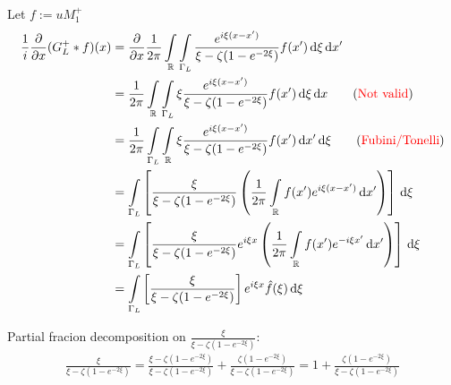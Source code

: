\documentclass[../dissertation.tex]{subfiles}
\begin{document}
Let $f:=uM_1^+$
\begin{align*}
	\frac{1}{i} \frac{\partial}{\partial x} (G_L^+ * f)(x)
		&= \frac{\partial}{\partial x} \frac{1}{2\pi}
			\mathop{\int}_{\mathbb R} 
				\mathop{\int}_{{\Gamma_L}} 
					\frac{e^{i \xi(x-x')}}{\xi-\zeta(1-e^{-2\xi})} f(x')
				\, \mathrm{d}\xi
			\, \mathrm{d}x' \\
		&= \frac{1}{2\pi}
			\mathop{\int}_{\mathbb R} 
				\mathop{\int}_{{\Gamma_L}} 
					\xi \frac{e^{i \xi(x-x')}}{\xi-\zeta(1-e^{-2\xi})} f(x')
				\, \mathrm{d}\xi
			\, \mathrm{d}x \qquad (\text{\color{red}Not valid})\\
		&= \frac{1}{2\pi}
			\mathop{\int}_{{\Gamma_L}} 
				\mathop{\int}_{\mathbb R} 
					\xi \frac{e^{i \xi(x-x')}}{\xi-\zeta(1-e^{-2\xi})} f(x')
				\, \mathrm{d}x'
			\, \mathrm{d}\xi \qquad (\text{\color{red}Fubini/Tonelli})\\
		&= \mathop{\int}_{{\Gamma_L}} 
				\left[
					\frac{\xi}{\xi-\zeta(1-e^{-2\xi})}
					\left(
						\frac{1}{2\pi}
						\mathop{\int}_{\mathbb R} 
							f(x')e^{i\xi(x-x')}
						\, \mathrm{d}x'
					\right)
				\right]
			\, \mathrm{d}\xi \\
		&= \mathop{\int}_{{\Gamma_L}} 
				\left[
					\frac{\xi}{\xi-\zeta(1-e^{-2\xi})}
					e^{i\xi x}
					\left(
						\frac{1}{2\pi}
						\mathop{\int}_{\mathbb R} 
							f(x')e^{-i\xi x'}
						\, \mathrm{d}x'
					\right)
				\right]
			\, \mathrm{d}\xi \\
		&= \mathop{\int}_{{\Gamma_L}} 
				\left[
					\frac{\xi}{\xi-\zeta(1-e^{-2\xi})}
				\right]
				e^{i\xi x} \hat f(\xi)
			\, \mathrm{d}\xi \\
\end{align*}

Partial fracion decomposition on $\displaystyle \frac{\xi}{\xi-\zeta(1-e^{-2\xi})}$:
\begin{align*}
	\frac{\xi}{\xi-\zeta(1-e^{-2\xi})}
		= \frac{\xi - \zeta(1-e^{-2\xi})}{\xi-\zeta(1-e^{-2\xi})} 
			+ \frac{\zeta(1-e^{-2\xi})}{\xi-\zeta(1-e^{-2\xi})} 
		= 1 + \frac{\zeta(1-e^{-2\xi})}{\xi-\zeta(1-e^{-2\xi})}
\end{align*}
\end{document}
